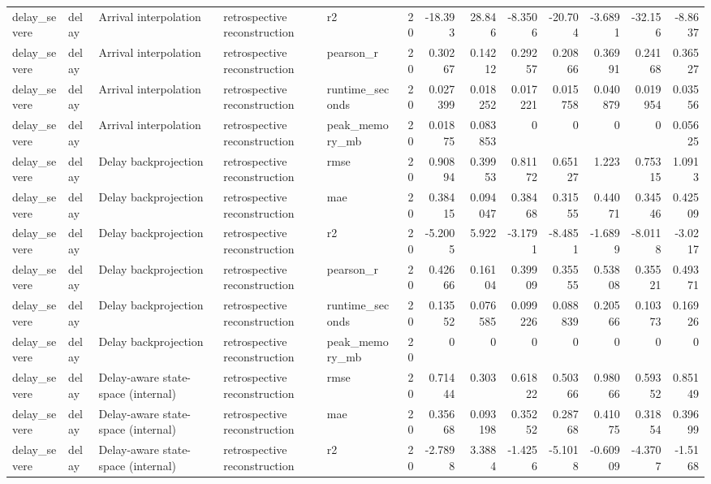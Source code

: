 \begin{table}[!htbp]
{{\begin{tabular}{lllllrrrrrrrr}
delay_severe & delay & Arrival interpolation & retrospective reconstruction & r2 & 20 & -18.393 & 28.846 & -8.3506 & -20.704 & -3.6891 & -32.156 & -8.8637 \\
delay_severe & delay & Arrival interpolation & retrospective reconstruction & pearson_r & 20 & 0.30267 & 0.14212 & 0.29257 & 0.20866 & 0.36991 & 0.24168 & 0.36527 \\
delay_severe & delay & Arrival interpolation & retrospective reconstruction & runtime_seconds & 20 & 0.027399 & 0.018252 & 0.017221 & 0.015758 & 0.040879 & 0.019954 & 0.03556 \\
delay_severe & delay & Arrival interpolation & retrospective reconstruction & peak_memory_mb & 20 & 0.01875 & 0.083853 & 0 & 0 & 0 & 0 & 0.05625 \\
delay_severe & delay & Delay backprojection & retrospective reconstruction & rmse & 20 & 0.90894 & 0.39953 & 0.81172 & 0.65127 & 1.223 & 0.75315 & 1.0913 \\
delay_severe & delay & Delay backprojection & retrospective reconstruction & mae & 20 & 0.38415 & 0.094047 & 0.38468 & 0.31555 & 0.44071 & 0.34546 & 0.42509 \\
delay_severe & delay & Delay backprojection & retrospective reconstruction & r2 & 20 & -5.2005 & 5.922 & -3.1791 & -8.4851 & -1.6899 & -8.0118 & -3.0217 \\
delay_severe & delay & Delay backprojection & retrospective reconstruction & pearson_r & 20 & 0.42666 & 0.16104 & 0.39909 & 0.35555 & 0.53808 & 0.35521 & 0.49371 \\
delay_severe & delay & Delay backprojection & retrospective reconstruction & runtime_seconds & 20 & 0.13552 & 0.076585 & 0.099226 & 0.088839 & 0.20566 & 0.10373 & 0.16926 \\
delay_severe & delay & Delay backprojection & retrospective reconstruction & peak_memory_mb & 20 & 0 & 0 & 0 & 0 & 0 & 0 & 0 \\
delay_severe & delay & Delay-aware state-space (internal) & retrospective reconstruction & rmse & 20 & 0.71444 & 0.303 & 0.61822 & 0.50366 & 0.98066 & 0.59352 & 0.85149 \\
delay_severe & delay & Delay-aware state-space (internal) & retrospective reconstruction & mae & 20 & 0.35668 & 0.093198 & 0.35252 & 0.28768 & 0.41075 & 0.31854 & 0.39699 \\
delay_severe & delay & Delay-aware state-space (internal) & retrospective reconstruction & r2 & 20 & -2.7898 & 3.3884 & -1.4256 & -5.1018 & -0.60909 & -4.3707 & -1.5168 \\

\end{tabular}}}
\end{table}
